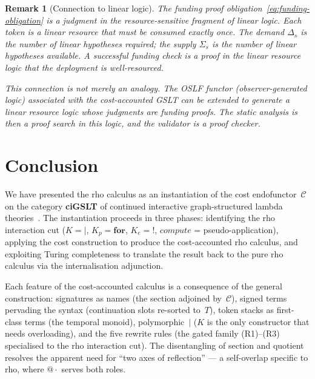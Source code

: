 \documentclass[11pt,a4paper]{article}
\makeatletter
\newtheorem{remark}[theorem]{Remark}
\newcommand{\Par}{\mathbin{|}}
\newcommand{\forc}{\mathbf{for}}
\newcommand{\quot}[1]{@#1}
\makeatother
\begin{document}
\begin{remark}[Connection to linear logic]
  The funding proof obligation~\eqref{eq:funding-obligation}
  is a judgment in the resource-sensitive fragment of linear
  logic.  Each token is a \emph{linear resource} that must
  be consumed exactly once.  The demand $\Delta_s$ is the
  number of linear hypotheses required; the supply $\Sigma_s$
  is the number of linear hypotheses available.  A successful
  funding check is a \emph{proof} in the linear resource
  logic that the deployment is well-resourced.

  This connection is not merely an analogy.  The OSLF functor
  (observer-generated logic) associated with the
  cost-accounted GSLT can be extended to generate a linear
  resource logic whose judgments \emph{are} funding proofs.
  The static analysis is then a proof search in this logic,
  and the validator is a proof checker.
\end{remark}

\section{Conclusion}
\label{sec:conclusion}

We have presented the rho calculus as an instantiation of the
cost endofunctor~$\mathcal{C}$ on the category \textbf{ciGSLT}
of continued interactive graph-structured lambda
theories~\cite{CostEndofunctor}.  The instantiation proceeds
in three phases: identifying the rho interaction cut
($K = \Par$, $K_p = \forc$, $K_e = {!}$, $\mathit{compute}$
= pseudo-application), applying the cost construction to
produce the cost-accounted rho calculus, and exploiting
Turing completeness to translate the result back to the pure
rho calculus via the internalisation adjunction.

Each feature of the cost-accounted calculus is a consequence
of the general construction: signatures as names (the section
adjoined by~$\mathcal{C}$), signed terms pervading the syntax
(continuation slots re-sorted to~$T$), token stacks as
first-class terms (the temporal monoid), polymorphic~$\Par$
($K$ is the only constructor that needs overloading), and the
five rewrite rules (the gated family (R1)--(R3) specialised to
the rho interaction cut).  The disentangling of section and
quotient resolves the apparent need for ``two axes of
reflection'' --- a self-overlap specific to rho, where
$\quot{\cdot}$ serves both roles.
\end{document}
